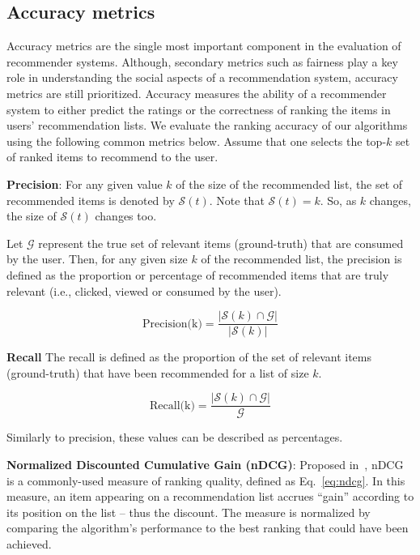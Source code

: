     
    \subsection{Accuracy metrics}
    
    Accuracy metrics are the single most important component in the evaluation of recommender systems. Although, secondary metrics such as fairness play a key role in understanding the social aspects of a recommendation system, accuracy metrics are still prioritized. Accuracy measures the ability of a recommender system to either predict the ratings or the correctness of ranking the items in users' recommendation lists. We evaluate the ranking accuracy of our algorithms using the following common metrics below. Assume that one selects the top-$k$ set of ranked items to recommend to the user.
    
        \textbf{Precision}: For any given value $k$ of the size of the recommended list, the set of recommended items is denoted by $\mathcal{S}(t)$. Note that $\mathcal{S}(t)=k$. So, as $k$ changes, the size of $\mathcal{S}(t)$ changes too.
        
        Let $\mathcal{G}$ represent the true set of relevant items (ground-truth) that are consumed by the user. Then, for any given size $k$ of the recommended list, the precision is defined as the proportion or percentage of recommended items that are truly relevant (i.e., clicked, viewed or consumed by the user). 
        
        \begin{equation}
        \text{Precision(k)}=\frac{|\mathcal{S}(k) \displaystyle \cap \mathcal{G}|}{|\mathcal{S}(k)|}
        \label{eq:precision}
        \end{equation}
        
        
        \textbf{Recall}
        The recall is defined as the proportion of the set of relevant items (ground-truth) that have been recommended for a list of size $k$.
        
        \begin{equation}
        \text{Recall(k)}=\frac{|\mathcal{S}(k) \displaystyle \cap \mathcal{G}|}{\mathcal{G}}
        \label{eq:recall}
        \end{equation}
        
        Similarly to precision, these values can be described as percentages.
        
        \textbf{Normalized Discounted Cumulative Gain (nDCG)}: Proposed in~\cite{jarvelin2002cumulated}, nDCG is a commonly-used measure of ranking quality, defined as Eq.~\eqref{eq:ndcg}. In this measure, an item appearing on a recommendation list accrues ``gain'' according to its position on the list -- thus the discount. The measure is normalized by comparing the algorithm's performance to the best ranking that could have been achieved. 


